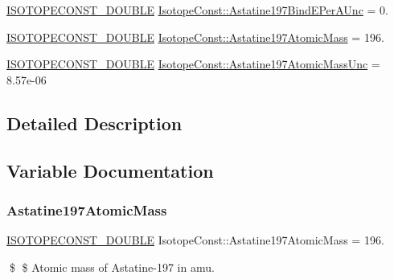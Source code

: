 \begin{DoxyCompactItemize}
\mbox{\hyperlink{group___isotope_const-_macros_ga8f45a7272ce02c0b4c65c44636ed719a}{I\+S\+O\+T\+O\+P\+E\+C\+O\+N\+S\+T\+\_\+\+D\+O\+U\+B\+LE}} \mbox{\hyperlink{group___isotope_const-_astatine-_at197_ga6f41737a9e93d45a178ecf8635594930}{Isotope\+Const\+::\+Astatine197\+Bind\+E\+Per\+A\+Unc}} = 0.
\item 
\mbox{\hyperlink{group___isotope_const-_macros_ga8f45a7272ce02c0b4c65c44636ed719a}{I\+S\+O\+T\+O\+P\+E\+C\+O\+N\+S\+T\+\_\+\+D\+O\+U\+B\+LE}} \mbox{\hyperlink{group___isotope_const-_astatine-_at197_ga6afa57d0071d59da9e87f876c08ae238}{Isotope\+Const\+::\+Astatine197\+Atomic\+Mass}} = 196.
\item 
\mbox{\hyperlink{group___isotope_const-_macros_ga8f45a7272ce02c0b4c65c44636ed719a}{I\+S\+O\+T\+O\+P\+E\+C\+O\+N\+S\+T\+\_\+\+D\+O\+U\+B\+LE}} \mbox{\hyperlink{group___isotope_const-_astatine-_at197_ga3c89e6c8bf0d4686e08e2641f6be94b7}{Isotope\+Const\+::\+Astatine197\+Atomic\+Mass\+Unc}} = 8.\+57e-\/06
\end{DoxyCompactItemize}


\subsection{Detailed Description}


\subsection{Variable Documentation}
\mbox{\label{group___isotope_const-_astatine-_at197_ga6afa57d0071d59da9e87f876c08ae238}} 
\subsubsection{\texorpdfstring{Astatine197\+Atomic\+Mass}{Astatine197AtomicMass}}
{\footnotesize\ttfamily \mbox{\hyperlink{group___isotope_const-_macros_ga8f45a7272ce02c0b4c65c44636ed719a}{I\+S\+O\+T\+O\+P\+E\+C\+O\+N\+S\+T\+\_\+\+D\+O\+U\+B\+LE}} Isotope\+Const\+::\+Astatine197\+Atomic\+Mass = 196.}

\$ \$ Atomic mass of Astatine-\/197 in amu. \mbox{\label{group___isotope_const-_astatine-_at197_ga3c89e6c8bf0d4686e08e2641f6be94b7}} 
